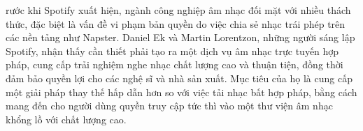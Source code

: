 rước khi Spotify xuất hiện, ngành công nghiệp âm nhạc đối mặt với nhiều thách thức, đặc biệt là vấn đề vi phạm bản quyền do việc chia sẻ nhạc trái phép trên các nền tảng như Napster. Daniel Ek và Martin Lorentzon, những người sáng lập Spotify, nhận thấy cần thiết phải tạo ra một dịch vụ âm nhạc trực tuyến hợp pháp, cung cấp trải nghiệm nghe nhạc chất lượng cao và thuận tiện, đồng thời đảm bảo quyền lợi cho các nghệ sĩ và nhà sản xuất. Mục tiêu của họ là cung cấp một giải pháp thay thế hấp dẫn hơn so với việc tải nhạc bất hợp pháp, bằng cách mang đến cho người dùng quyền truy cập tức thì vào một thư viện âm nhạc khổng lồ với chất lượng cao. 